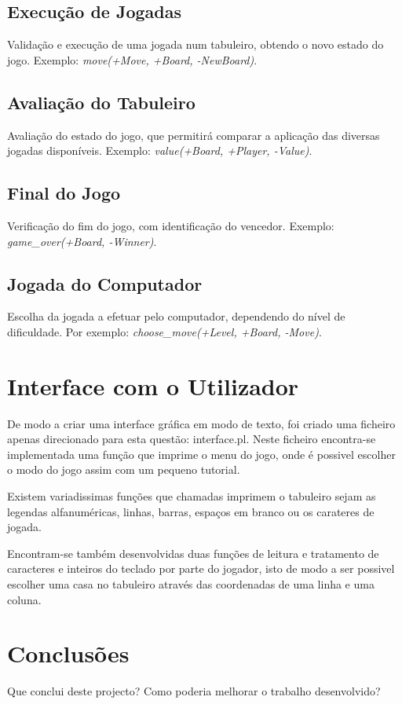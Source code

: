 \documentclass[a4paper]{article}
\begin{document}
\subsection{Execução de Jogadas} Validação e execução de uma jogada num tabuleiro, obtendo o novo estado do jogo. Exemplo: \textit{move(+Move, +Board, -NewBoard)}.

\subsection{Avaliação do Tabuleiro} Avaliação do estado do jogo, que permitirá comparar a aplicação das diversas jogadas disponíveis. Exemplo: \textit{value(+Board, +Player, -Value)}.

\subsection{Final do Jogo} Verificação do fim do jogo, com identificação do vencedor. Exemplo: \textit{game\_over(+Board, -Winner)}.

\subsection{Jogada do Computador} Escolha da jogada a efetuar pelo computador, dependendo do nível de dificuldade. Por exemplo: \textit{choose\_move(+Level, +Board, -Move)}.


\section{Interface com o Utilizador}

De modo a criar uma interface gráfica em modo de texto, foi criado uma ficheiro apenas direcionado para esta questão: interface.pl. Neste ficheiro encontra-se implementada uma função que imprime o menu do jogo, onde é possivel escolher o modo do jogo assim com um pequeno tutorial. 

Existem variadissimas funções que chamadas imprimem o tabuleiro sejam as legendas alfanuméricas, linhas, barras, espaços em branco ou os carateres de jogada. 

Encontram-se também desenvolvidas duas funções de leitura e tratamento de caracteres e inteiros do teclado por parte do jogador, isto de modo a ser possivel escolher uma casa no tabuleiro através das coordenadas de uma linha e uma coluna.

\section{Conclusões}
Que conclui deste projecto? Como poderia melhorar o trabalho desenvolvido?
\end{document}

